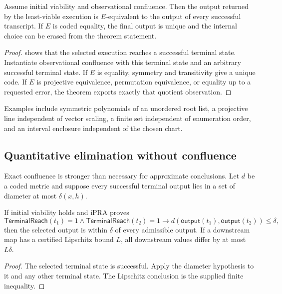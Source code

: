\begin{theorem}
\label{thm:branch-invariant}
Assume initial viability and observational confluence.  Then the output returned by the least-viable execution is $E$-equivalent to the output of every successful transcript.  If $E$ is coded equality, the final output is unique and the internal choice can be erased from the theorem statement.
\end{theorem}

\begin{proof}
 shows that the selected execution reaches a successful terminal state.  Instantiate observational confluence with this terminal state and an arbitrary successful terminal state.  If $E$ is equality, symmetry and transitivity give a unique code.  If $E$ is projective equivalence, permutation equivalence, or equality up to a requested error, the theorem exports exactly that quotient observation.
\end{proof}

Examples include symmetric polynomials of an unordered root list, a projective line independent of vector scaling, a finite set independent of enumeration order, and an interval enclosure independent of the chosen chart.

\subsection{Quantitative elimination without confluence}

Exact confluence is stronger than necessary for approximate conclusions.  Let $d$ be a coded metric and suppose every successful terminal output lies in a set of diameter at most $\delta(x,h)$.

\begin{theorem}
\label{thm:stable-output}
If initial viability holds and iPRA proves
\[
 \mathsf{TerminalReach}(t_1)=1\wedge\mathsf{TerminalReach}(t_2)=1
 \to d(\mathsf{output}(t_1),\mathsf{output}(t_2))\le\delta,
\]
then the selected output is within $\delta$ of every admissible output.  If a downstream map has a certified Lipschitz bound $L$, all downstream values differ by at most $L\delta$.
\end{theorem}

\begin{proof}
The selected terminal state is successful.  Apply the diameter hypothesis to it and any other terminal state.  The Lipschitz conclusion is the supplied finite inequality.
\end{proof}

